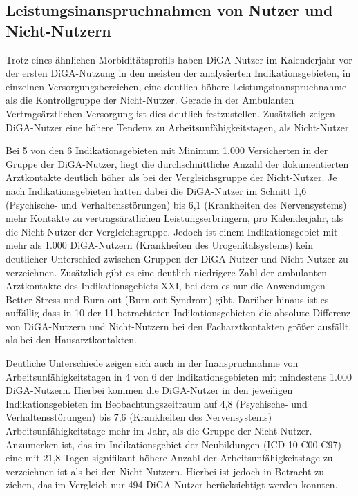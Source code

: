 \documentclass{article}
\begin{document}
		\subsection{Leistungsinanspruchnahmen von Nutzer und Nicht-Nutzern}
			Trotz eines ähnlichen Morbiditätsprofils haben DiGA-Nutzer im Kalenderjahr vor der ersten DiGA-Nutzung in den meisten der analysierten Indikationsgebieten, in einzelnen Versorgungsbereichen, eine deutlich höhere Leistungsinanspruchnahme als die Kontrollgruppe der Nicht-Nutzer. Gerade in der Ambulanten Vertragsärztlichen Versorgung ist dies deutlich festzustellen. Zusätzlich zeigen DiGA-Nutzer eine höhere Tendenz zu Arbeitsunfähigkeitstagen, als Nicht-Nutzer.\par
			Bei 5 von den 6 Indikationsgebieten mit Minimum 1.000 Versicherten in der Gruppe der DiGA-Nutzer, liegt die durchschnittliche Anzahl der dokumentierten Arztkontakte deutlich höher als bei der Vergleichsgruppe der Nicht-Nutzer. Je nach Indikationsgebieten hatten dabei die DiGA-Nutzer im Schnitt 1,6 (Psychische- und Verhaltensstörungen) bis 6,1 (Krankheiten des Nervensystems) mehr Kontakte zu vertragsärztlichen Leistungserbringern, pro Kalenderjahr, als die Nicht-Nutzer der Vergleichsgruppe. Jedoch ist einem Indikationsgebiet mit mehr als 1.000 DiGA-Nutzern (Krankheiten des Urogenitalsystems) kein deutlicher Unterschied zwischen Gruppen der DiGA-Nutzer und Nicht-Nutzer zu verzeichnen. Zusätzlich gibt es eine deutlich niedrigere Zahl der ambulanten Arztkontakte des Indikationsgebiets XXI, bei dem es nur die Anwendungen Better Stress und Burn-out (Burn-out-Syndrom) gibt. Darüber hinaus ist es  auffällig dass in 10 der 11 betrachteten Indikationsgebieten die absolute Differenz von DiGA-Nutzern und Nicht-Nutzern bei den Facharztkontakten größer ausfällt, als bei den Hausarztkontakten.\par 
			Deutliche Unterschiede zeigen sich auch in der Inanspruchnahme von Arbeitsunfähigkeitstagen in 4 von 6 der Indikationsgebieten mit mindestens 1.000 DiGA-Nutzern. Hierbei kommen die DiGA-Nutzer in den jeweiligen Indikationsgebieten im Beobachtungszeitraum auf 4,8 (Psychische- und Verhaltensstörungen) bis 7,6 (Krankheiten des Nervensystems) Arbeitsunfähigkeitstage mehr im Jahr, als die Gruppe der Nicht-Nutzer. Anzumerken ist, das im Indikationsgebiet der Neubildungen (ICD-10 C00-C97) eine mit 21,8 Tagen signifikant höhere Anzahl der Arbeitsunfähigkeitstage zu verzeichnen ist als bei den Nicht-Nutzern. Hierbei ist jedoch in Betracht zu ziehen, das im Vergleich nur 494 DiGA-Nutzer berücksichtigt werden konnten.\par
\end{document}
